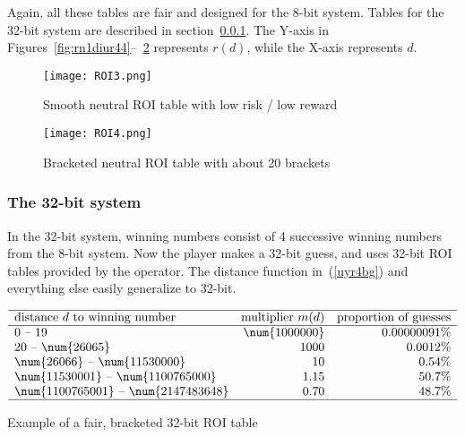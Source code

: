 \documentclass[oneside,10pt]{book}
\renewcommand{\arraystretch}{1.4} %
\begin{document}
Again, all these tables are fair and designed for the 8-bit system. Tables for the 32-bit system are described
 in section~\ref{32bitsre}. The Y-axis in Figures~\ref{fig:rn1diur44}--~\ref{fig:rn1dqwaswigyt} represents $r(d)$, while the X-axis represents $d$.

\begin{figure}[H]
\centering
\texttt{[image: ROI3.png]}  
\caption{Smooth neutral ROI table with low risk / low reward}
\label{fig:rn1ffdsdigyt}
\end{figure}


\begin{figure}[H]
\centering
\texttt{[image: ROI4.png]}  
\caption{Bracketed neutral ROI table with about 20 brackets}
\label{fig:rn1dqwaswigyt}
\end{figure}


\subsubsection{The 32-bit system}\label{32bitsre}

In the 32-bit system, winning numbers consist of 4 successive winning numbers from the 8-bit system. Now the player makes
 a 32-bit guess, and uses 32-bit ROI tables provided by the operator. The distance function in~(\ref{uyr4bg}) and everything else easily generalize to 32-bit. 



\renewcommand{\arraystretch}{1.2} %
\begin{table}[H]
\[
\begin{array}{lrr}
\hline
\text{distance } d \text{ to winning number}	&  \text{multiplier } m(d)  & \text{proportion of guesses}\\ 
\hline
  0 \text{ -- } 19                             &  \num{1000000}   &  0.00000091\% \\
  20 \text{ -- } \num{26065}                      &   1000 &   0.0012\% \\
 \num{26066} \text{ -- }  \num{11530000} &    10  &   0.54\%\\
 \num{11530001} \text{ -- }  \num{1100765000}  & 1.15 &  50.7\%     \\
 \num{1100765001} \text{ -- }  \num{2147483648}  & 0.70 &  48.7\%   \\
\hline
\end{array}
\]
\caption{\label{taxzqa} Example of a fair, bracketed 32-bit ROI table}
\end{table}
\renewcommand{\arraystretch}{1.0} %
\end{document}
